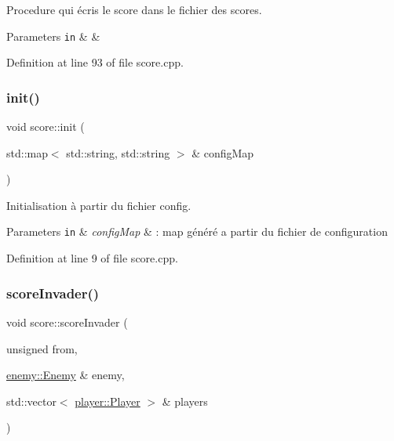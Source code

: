 Procedure qui écris le score dans le fichier des scores. 


\begin{DoxyParams}[1]{Parameters}
\mbox{\tt in}  & {\em } & \\
\hline
\end{DoxyParams}


Definition at line 93 of file score.\+cpp.

\mbox{\label{namespacescore_af95066a9c5dff49a5a9d5ee29f162757}} 
\subsubsection{\texorpdfstring{init()}{init()}}
{\footnotesize\ttfamily void score\+::init (\begin{DoxyParamCaption}\item[{std\+::map$<$ std\+::string, std\+::string $>$ \&}]{config\+Map }\end{DoxyParamCaption})}



Initialisation à partir du fichier config. 


\begin{DoxyParams}[1]{Parameters}
\mbox{\tt in}  & {\em config\+Map} & \+: map généré a partir du fichier de configuration \\
\hline
\end{DoxyParams}


Definition at line 9 of file score.\+cpp.

\mbox{\label{namespacescore_a53974e9c6b708076269b611addd8eed1}} 
\subsubsection{\texorpdfstring{score\+Invader()}{scoreInvader()}}
{\footnotesize\ttfamily void score\+::score\+Invader (\begin{DoxyParamCaption}\item[{unsigned}]{from,  }\item[{\hyperlink{structenemy_1_1_enemy}{enemy\+::\+Enemy} \&}]{enemy,  }\item[{std\+::vector$<$ \hyperlink{structplayer_1_1_player}{player\+::\+Player} $>$ \&}]{players }\end{DoxyParamCaption})}



